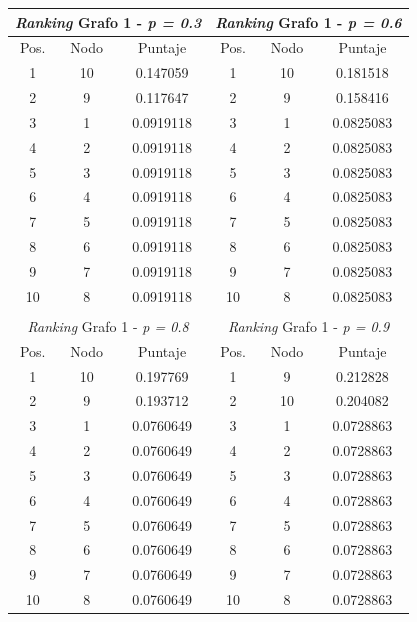 \begin{center}
         \begin{tabular}{|c|c|c||c|c|c|}
                    \hline
                    \multicolumn{3}{|c||}{\emph{Ranking} Grafo 1 - \emph{p = 0.3}} & \multicolumn{3}{c|}{\emph{Ranking} Grafo 1 - \emph{p = 0.6}} \\ \hline
                    Pos. & Nodo & Puntaje    & Pos. & Nodo & Puntaje  \\ \hline
1 & 10 & 0.147059 & 1 & 10 &  0.181518 \\ 
2 & 9 & 0.117647 & 2 & 9 &  0.158416 \\
3 & 1 & 0.0919118 & 3 & 1 & 0.0825083 \\
4 & 2 & 0.0919118 & 4 & 2 & 0.0825083 \\
5 & 3 & 0.0919118 & 5 & 3 & 0.0825083 \\
6 & 4 & 0.0919118 & 6 & 4 & 0.0825083 \\
7 & 5 & 0.0919118 & 7 & 5 & 0.0825083 \\
8 & 6 & 0.0919118 & 8 & 6 & 0.0825083 \\
9 & 7 & 0.0919118 & 9 & 7 & 0.0825083 \\
10 & 8 & 0.0919118 & 10 & 8  & 0.0825083 \\ \hline
                    \multicolumn{6}{c}{} \\ \hline
                    \multicolumn{3}{|c||}{\emph{Ranking} Grafo 1 - \emph{p = 0.8}} & \multicolumn{3}{c|}{\emph{Ranking} Grafo 1 - \emph{p = 0.9}} \\ \hline
                    Pos. & Nodo & Puntaje    & Pos. & Nodo & Puntaje  \\ \hline
1 & 10 & 0.197769  & 1 & 9 &  0.212828 \\ 
2 & 9 & 0.193712  & 2 & 10 &  0.204082 \\
3 & 1 & 0.0760649  & 3 & 1 & 0.0728863 \\
4 & 2 & 0.0760649  & 4 & 2 & 0.0728863 \\
5 & 3 & 0.0760649  & 5 & 3 & 0.0728863 \\
6 & 4 & 0.0760649  & 6 & 4 & 0.0728863 \\
7 & 5 & 0.0760649  & 7 & 5 & 0.0728863 \\
8 & 6 & 0.0760649  & 8 & 6 & 0.0728863 \\
9 & 7 & 0.0760649  & 9 & 7 & 0.0728863 \\
10 & 8 & 0.0760649 & 10 & 8  & 0.0728863 \\ \hline

                \end{tabular}
            \end{center}

